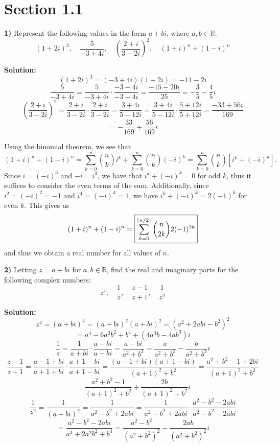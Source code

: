 \documentclass[12pt]{article}
\newcommand{\R}{\ensuremath{\mathbb{R}}}
\newcommand{\bracketb}[1]{\left[#1\right]}
\newcommand{\parenb}[1]{\left(#1\right)}
\DeclarePairedDelimiter\floor{\lfloor}{\rfloor}
\begin{document}
\pagestyle{fancy}

\setlength{\parindent}{0in}
\setlength{\parskip}{0.1in}

\section*{Section 1.1}

\textbf{1)} Represent the following values in the form \( a + bi \), where
\( a, b \in \R\).
\[
	(1 + 2i)^3, \quad
	\frac{5}{-3 + 4i}, \quad
	\parenb{ \frac{2 + i}{3 - 2i} }^2, \quad
	(1 + i)^n + (1 - i)^n
\]

\textbf{Solution:}
\[ (1 + 2i)^3 = (-3 + 4i)(1 + 2i) = \boxed{-11 - 2i} \]
\[
	\frac{5}{-3 + 4i} =
	\frac{5}{-3 + 4i} \cdot \frac{-3 - 4i}{-3 - 4i} =
	\frac{-15 - 20i}{25} =
	\boxed{-\frac{3}{5} - \frac{4}{5}i}
\]
\[
	\parenb{\frac{2 + i}{3 - 2i}}^2 =
	\frac{2 + i}{3 - 2i} \cdot \frac{2 + i}{3 - 2i} =
	\frac{3 + 4i}{5 - 12i} =
	\frac{3 + 4i}{5 - 12i} \cdot \frac{5 + 12i}{5 + 12i} =
	\frac{-33 + 56i}{169}
\]
\[ = \boxed{-\frac{33}{169} + \frac{56}{169}i} \]

Using the binomial theorem, we see that
\[
	(1 + i)^n + (1 - i)^n
	= \sum_{k = 0}^n \binom{n}{k}i^k + \sum_{k = 0}^n \binom{n}{k}(-i)^k
	= \sum_{k = 0}^n \binom{n}{k} \bracketb{i^k + (-i)^k}.
\]
Since \( i = (-i)^3 \) and \( -i = i^3 \), we have that
\( i^k + (-i)^k = 0 \) for odd \( k \), thus it suffices to consider the even
terms of the sum.
Additionally, since \( i^2 = (-i)^2 = -1 \) and \( i^4 = (-i)^4 = 1 \), we have
\( i^k + (-i)^k = 2(-1)^k \) for even \( k \).
This gives us
\[
	(1 + i)^n + (1 - i)^n
	= \boxed{\sum_{k = 0}^{\floor{n/2}} \binom{n}{2k} 2(-1)^{2k}}
\]
and thus we obtain a real number for all values of \( n \).

\textbf{2)} Letting \( z = a + bi \) for \( a,b \in \R \), find the real and
imaginary parts for the following complex numbers:
\[
	z^4, \quad
	\frac{1}{z}, \quad
	\frac{z - 1}{z + 1}, \quad
	\frac{1}{z^2}
\]

\textbf{Solution:}
\[
	z^4 = (a + bi)^4 = (a + bi)^2 (a + bi)^2 = (a^2 + 2abi - b^2)^2
\]
\[
	= \boxed{a^4 - 6a^2b^2 + b^4 + (4a^3b  - 4ab^3)i}
\]
\[
	\frac{1}{z} = \frac{1}{a + bi} \cdot \frac{a - bi}{a - bi}
	= \frac{a - bi}{a^2 + b^2}
	= \boxed{\frac{a}{a^2 + b^2} - \frac{b}{a^2 + b^2}i}
\]
\[
	\frac{z - 1}{z + 1} = \frac{a - 1 + bi}{a + 1 + bi}
	\cdot \frac{a + 1 - bi}{a + 1 - bi}
	= \frac{(a - 1 + bi)(a + 1 - bi)}{(a + 1)^2 + b^2}
	= \frac{a^2 + b^2 - 1 + 2bi}{(a + 1)^2 + b^2}
\]
\[
	= \boxed{
		\frac{a^2 + b^2 - 1}{(a + 1)^2 + b^2}
		+ \frac{2b}{(a + 1)^2 + b^2}i
	}
\]
\[
	\frac{1}{z^2} = \frac{1}{(a + bi)^2} = \frac{1}{a^2 - b^2 + 2abi}
	= \frac{1}{a^2 - b^2 + 2abi}
	\cdot \frac{a^2 - b^2 - 2abi}{a^2 - b^2 - 2abi}
\]
\[
	= \frac{a^2 - b^2 - 2abi}{a^4 + 2a^2b^2 + b^4}
	= \boxed{
		\frac{a^2 - b^2}{(a^2 + b^2)^2} - \frac{2ab}{(a^2 + b^2)^2}i
	}
\]
\end{document}
